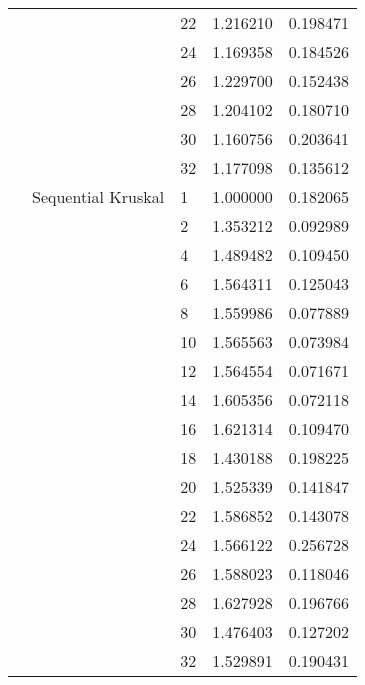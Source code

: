 \begin{tabular}{lllrr}
                      &                     & 22 &  1.216210 &  0.198471 \\
                      &                     & 24 &  1.169358 &  0.184526 \\
                      &                     & 26 &  1.229700 &  0.152438 \\
                      &                     & 28 &  1.204102 &  0.180710 \\
                      &                     & 30 &  1.160756 &  0.203641 \\
                      &                     & 32 &  1.177098 &  0.135612 \\
                      & Sequential Kruskal & 1  &  1.000000 &  0.182065 \\
                      &                     & 2  &  1.353212 &  0.092989 \\
                      &                     & 4  &  1.489482 &  0.109450 \\
                      &                     & 6  &  1.564311 &  0.125043 \\
                      &                     & 8  &  1.559986 &  0.077889 \\
                      &                     & 10 &  1.565563 &  0.073984 \\
                      &                     & 12 &  1.564554 &  0.071671 \\
                      &                     & 14 &  1.605356 &  0.072118 \\
                      &                     & 16 &  1.621314 &  0.109470 \\
                      &                     & 18 &  1.430188 &  0.198225 \\
                      &                     & 20 &  1.525339 &  0.141847 \\
                      &                     & 22 &  1.586852 &  0.143078 \\
                      &                     & 24 &  1.566122 &  0.256728 \\
                      &                     & 26 &  1.588023 &  0.118046 \\
                      &                     & 28 &  1.627928 &  0.196766 \\
                      &                     & 30 &  1.476403 &  0.127202 \\
                      &                     & 32 &  1.529891 &  0.190431 \\

\end{tabular}
